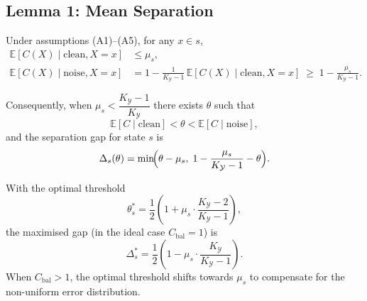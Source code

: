 \subsection{Lemma 1: Mean Separation}
\label{sec:thm1:lemma1}

\begin{lemma}
\label{lem:mean-separation}
Under assumptions (A1)--(A5), for any $x \in s$,
\begin{align}
\mathbb{E}[C(X) \mid \text{clean}, X = x] &\leq \mu_s,
\label{eq:lem1-clean} \\
\mathbb{E}[C(X) \mid \text{noise}, X = x]
&= 1 - \frac{1}{K_{\mathcal{Y}} - 1} \,
   \mathbb{E}[C(X) \mid \text{clean}, X = x]
   \;\geq\; 1 - \frac{\mu_s}{K_{\mathcal{Y}} - 1}.
\label{eq:lem1-noise}
\end{align}

Consequently, when $\mu_s < \dfrac{K_{\mathcal{Y}} - 1}{K_{\mathcal{Y}}}$
there exists $\theta$ such that
\[
\mathbb{E}[C \mid \text{clean}] < \theta < \mathbb{E}[C \mid \text{noise}],
\]
and the separation gap for state $s$ is
\begin{equation}
\Delta_s(\theta)
= \min\!\Bigl(\theta - \mu_s,\;
  1 - \frac{\mu_s}{K_{\mathcal{Y}}-1} - \theta\Bigr).
\label{eq:separation-gap}
\end{equation}

With the optimal threshold
\[
\theta_s^* = \frac12\!\left(1 + \mu_s\cdot\frac{K_{\mathcal{Y}}-2}{K_{\mathcal{Y}}-1}\right)\!,
\]
the maximised gap (in the ideal case $C_{\text{bal}}=1$) is
\[
\Delta_s^* = \frac12\!\left(1 - \mu_s\cdot\frac{K_{\mathcal{Y}}}{K_{\mathcal{Y}}-1}\right).
\]
When $C_{\text{bal}} > 1$, the optimal threshold shifts towards $\mu_s$ to
compensate for the non-uniform error distribution.
\end{lemma}

